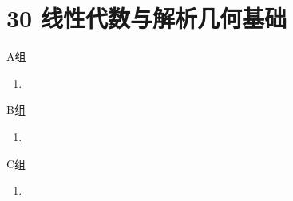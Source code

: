 \section*{30 线性代数与解析几何基础}

\vspace{2ex}

\centerline{\heiti A组}
\begin{enumerate}
    \item
\end{enumerate}

\centerline{\heiti B组}
\begin{enumerate}
    \item
\end{enumerate}

\centerline{\heiti C组}
\begin{enumerate}
    \item
\end{enumerate}

\clearpage
